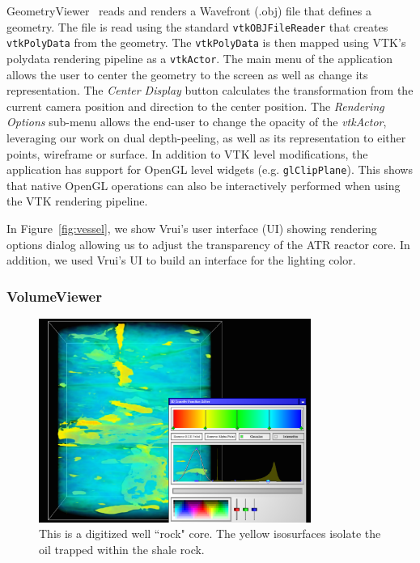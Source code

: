 GeometryViewer~\cite{GeometryViewer} reads and renders a Wavefront (.obj) file that defines a geometry.
The file is read using the standard \texttt{vtkOBJFileReader} that creates \texttt{vtkPolyData} from the geometry.
The \texttt{vtkPolyData} is then mapped using VTK's polydata rendering pipeline as a \texttt{vtkActor}.
The main menu of the application allows the user to center the geometry to the screen as well as change its representation.
The \textit{Center Display} button calculates the transformation from the current camera position and direction to the center position.
The \textit{Rendering Options} sub-menu allows the end-user to change the opacity of the \textit{vtkActor}, leveraging our work on dual depth-peeling, as well as its representation to either points, wireframe or surface.
In addition to VTK level modifications, the application has support for OpenGL level widgets (e.g. \texttt{glClipPlane}).
This shows that native OpenGL operations can also be interactively performed when using the VTK rendering pipeline.

In Figure~\ref{fig:vessel}, we show Vrui's user interface (UI) showing rendering options dialog allowing us to adjust the transparency of the ATR reactor core.
In addition, we used Vrui's UI to build an interface for the lighting color.

\subsubsection{VolumeViewer}

\begin{figure}[h!]
 \centering
 \includegraphics[width=3.5in]{images/rock-transferfunction.png}
 \caption{This is a digitized well ``rock" core. The yellow isosurfaces isolate the oil trapped within the shale rock.}
 \label{fig:volume}
\end{figure}

